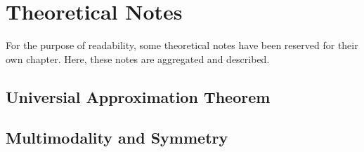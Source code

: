\documentclass[./\jobname.tex]{subfiles}
\begin{document}
\chapter{Theoretical Notes}
For the purpose of readability, some theoretical notes have been reserved for their own chapter. Here, these notes are aggregated and described. 

\section{Universial Approximation Theorem}
\label{chap:gsin_approximation_theorem}

\section{Multimodality and Symmetry}
\label{chap:multimodality_and_symmetry}
\end{document}
